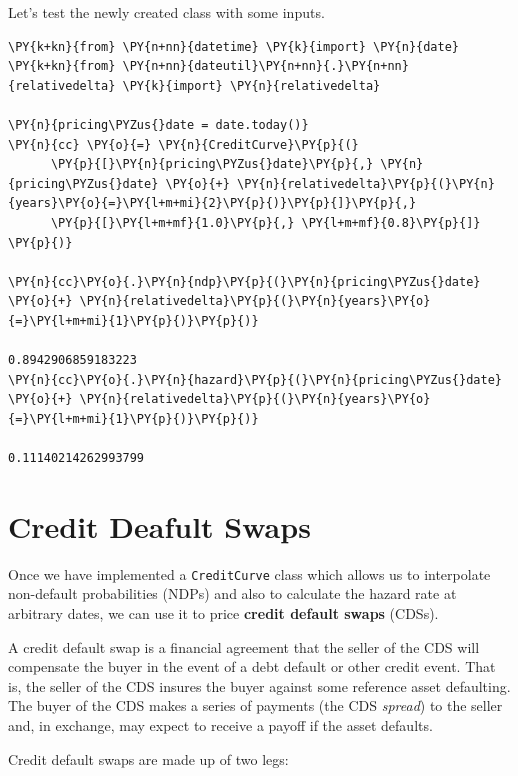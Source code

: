 Let's test the newly created class with some inputs.
\begin{tcolorbox}[breakable, size=fbox, boxrule=1pt, pad at break*=1mm,colback=cellbackground, colframe=cellborder]
	\begin{Verbatim}[commandchars=\\\{\}]
\PY{k+kn}{from} \PY{n+nn}{datetime} \PY{k}{import} \PY{n}{date}
\PY{k+kn}{from} \PY{n+nn}{dateutil}\PY{n+nn}{.}\PY{n+nn}{relativedelta} \PY{k}{import} \PY{n}{relativedelta}

\PY{n}{pricing\PYZus{}date = date.today()}        
\PY{n}{cc} \PY{o}{=} \PY{n}{CreditCurve}\PY{p}{(}
      \PY{p}{[}\PY{n}{pricing\PYZus{}date}\PY{p}{,} \PY{n}{pricing\PYZus{}date} \PY{o}{+} \PY{n}{relativedelta}\PY{p}{(}\PY{n}{years}\PY{o}{=}\PY{l+m+mi}{2}\PY{p}{)}\PY{p}{]}\PY{p}{,}
      \PY{p}{[}\PY{l+m+mf}{1.0}\PY{p}{,} \PY{l+m+mf}{0.8}\PY{p}{]}
\PY{p}{)}

\PY{n}{cc}\PY{o}{.}\PY{n}{ndp}\PY{p}{(}\PY{n}{pricing\PYZus{}date} \PY{o}{+} \PY{n}{relativedelta}\PY{p}{(}\PY{n}{years}\PY{o}{=}\PY{l+m+mi}{1}\PY{p}{)}\PY{p}{)}

0.8942906859183223
\PY{n}{cc}\PY{o}{.}\PY{n}{hazard}\PY{p}{(}\PY{n}{pricing\PYZus{}date} \PY{o}{+} \PY{n}{relativedelta}\PY{p}{(}\PY{n}{years}\PY{o}{=}\PY{l+m+mi}{1}\PY{p}{)}\PY{p}{)}

0.11140214262993799
\end{Verbatim}
\end{tcolorbox}    
            
\section{Credit Deafult Swaps}\label{credit-deafult-swaps}

Once we have implemented a \texttt{CreditCurve} class which allows us to
interpolate non-default probabilities (NDPs) and also to calculate the hazard rate at arbitrary
dates, we can use it to price \textbf{credit default swaps} (CDSs).

A credit default swap is a financial agreement that the seller of the CDS will compensate the buyer in the event of a debt default or other credit event. 
That is, the seller of the CDS insures the buyer against some reference asset defaulting. The buyer of the CDS makes a series of payments (the CDS \emph{spread}) to the seller and, in exchange, may expect to receive a payoff if the asset defaults.

Credit default swaps are made up of two legs:

